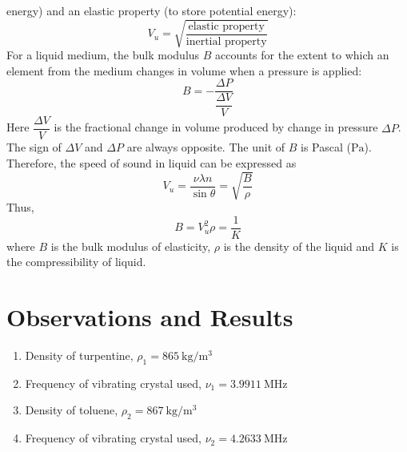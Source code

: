 \documentclass{article}
\begin{document}
energy) and an elastic property (to store potential energy):
\begin{equation}
    V_u = \sqrt{\dfrac{\text{elastic property}}{\text{inertial property}}}
\end{equation}
For a liquid medium, the bulk modulus $B$ accounts for the extent to which an element 
from the medium changes in volume when a pressure is applied:
\begin{equation}
    B = - \dfrac{\Delta P}{\dfrac{\Delta V}{V}}
\end{equation}
Here $\dfrac{\Delta V}{V}$ is the fractional change in volume produced by change in pressure $\Delta P$. The sign of $\Delta V$ and $\Delta P$ are always opposite. The unit of $B$ is Pascal ($\si{\pascal}$). Therefore, the speed of sound in liquid can be expressed as
\begin{equation}
\label{eq6}
    V_u = \dfrac{\nu \lambda n}{\sin \theta} = \sqrt{\dfrac{B}{\rho}}
\end{equation}
Thus,
\begin{equation}
\label{eq7}
    B = V_u^2 \rho = \dfrac{1}{K}
\end{equation}
where $B$ is the bulk modulus of elasticity, $\rho$ is the density of the liquid and $K$ is the compressibility of liquid.

\section{Observations and Results}
\begin{enumerate}
    \item Density of turpentine, $\rho_1 = \SI{865}{\kilogram \per \metre \cubed}$
    \item Frequency of vibrating crystal used, $\nu_1 = \SI{3.9911}{\mega \hertz}$
    \item Density of toluene, $\rho_2 = \SI{867}{\kilogram \per \metre \cubed}$
    \item Frequency of vibrating crystal used, $\nu_2 = \SI{4.2633}{\mega \hertz}$
\end{enumerate}


\end{document}
